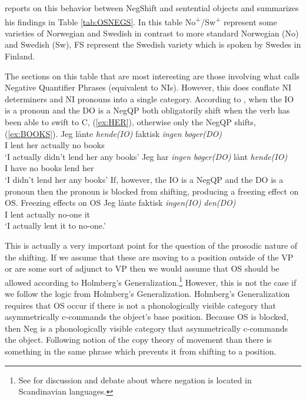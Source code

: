 \documentclass[12pt, letterpaper]{article}
\begin{document}
\citet{christensenInterfacesNegationSyntax2005} reports on this behavior between NegShift and sentential objects and summarizes his findings in Table \ref{tab:OSNEGS}. In this table No\textsuperscript{+}/Sw\textsuperscript{+} represent some varieties of Norwegian and Swedish in contrast to more standard Norwegian (No) and Swedish (Sw), FS represent the Swedish variety which is spoken by Swedes in Finland.

The sections on this table that are most interesting are those involving what \citeauthor{christensenInterfacesNegationSyntax2005} calls Negative Quantifier Phrases (equivalent to NIs). However, this does conflate NI determiners and NI pronouns into a single category. According to \citeauthor{christensenInterfacesNegationSyntax2005}, when the IO is a pronoun and the DO is a NegQP both obligatorily shift when the verb has been able to swift to C, (\ref{ex:HER}), otherwise only the NegQP shifts, (\ref{ex:BOOKS}).
	\ea 
		\ea \label{ex:HER}
		\gll Jeg lånte \textit{hende(IO)} faktisk \textit{ingen} \textit{bøger(DO)}\\
		I lent her actually no books\\
		\glt `I actually didn't lend her any books'
		\ex \label{ex:BOOKS}
		\gll Jeg har \textit{ingen} \textit{bøger(DO)} lånt \textit{hende(IO)}\\
		I have no books lend her\\
		\glt `I didn't lend her any books'
		\z 
	\z 
If, however, the IO is a NegQP and the DO is a pronoun then the pronoun is blocked from shifting, producing a freezing effect on OS.
	\ea Freezing effects on OS
		\ea 
		\gll Jeg lånte faktisk \textit{ingen(IO)} \textit{den(DO)}\\
		I lent actually no-one it\\
		\glt `I actually lent it to no-one.'
		\z 
	\z

This is actually a very important point for the question of the prosodic nature of the shifting. If we assume that these are moving to a position outside of the VP or are some sort of adjunct to VP then we would assume that OS should be allowed according to Holmberg's Generalization.\footnote{See \citet{thrainssonSyntaxIcelandic2010} for discussion and debate about where negation is located in Scandinavian languages.} However, this is not the case if we follow the logic from Holmberg's Generalization. Holmberg's Generalization requires that OS occur if there is not a phonologically visible category that asymmetrically c-commands the object's base position. Because OS is blocked, then Neg is a phonologically visible category that asymmetrically c-commands the object. Following \citet{chomskyMinimalistProgramLinguistic1993,chomskyMinimalistProgram1995} notion of the copy theory of movement than there is something in the same phrase which prevents it from shifting to a position. 
\end{document}
